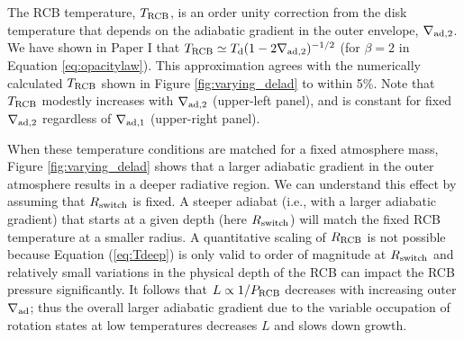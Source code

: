 
The RCB temperature, $T_{\rm RCB}$, is an order unity correction from the disk temperature that depends on the adiabatic gradient in the outer envelope, $\nabla_{\rm ad,2}$.  We have shown in Paper I that $T_{\rm RCB} \simeq T_{\rm d} (1- 2 \nabla_{\rm ad, 2})^{-1/2}$ (for $\beta=2$ in Equation \ref{eq:opacitylaw}). This approximation agrees with the numerically calculated $T_{\rm RCB}$ shown in Figure \ref{fig:varying_delad} to within 5\%. Note that $T_{\rm RCB}$ modestly increases with $\nabla_{\rm ad,2}$ (upper-left panel), and is constant for fixed $\nabla_{\rm ad,2}$  regardless of $\nabla_{\rm ad,1}$ (upper-right panel).


When these temperature conditions are matched for a fixed atmosphere mass, Figure \ref{fig:varying_delad} shows that a larger adiabatic gradient in the outer atmosphere results in a deeper radiative region. We can understand this effect by assuming that $R_{\rm switch}$ is fixed. A steeper adiabat (i.e., with a larger adiabatic gradient) that starts at a given depth (here $R_{\rm switch}$) will match the fixed RCB temperature at a smaller radius. A quantitative scaling of $R_{\rm RCB}$ is not possible because Equation (\ref{eq:Tdeep})  is only valid to order of magnitude at $R_{\rm switch}$ and relatively small variations in the physical depth of the RCB can impact the RCB pressure significantly. It follows that $L \propto 1/P_{\rm RCB}$ decreases with increasing outer $\nabla_{\rm ad}$; thus the overall larger adiabatic gradient due to the variable occupation of rotation states at low temperatures decreases $L$ and slows down growth. 



